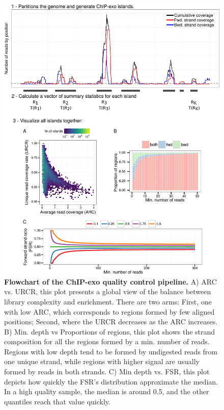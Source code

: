 \documentclass{bmcart}\usepackage[]{graphicx}\usepackage[]{color}
\begin{document}

\newpage

\begin{figure}[h!]
  \centering
  \includegraphics[width = \textwidth]{../figs/for_paper/coverage_diagram3.pdf}
  \caption{\textbf{Flowchart of the ChIP-exo quality control
      pipeline.} A) ARC vs. URCR, this plot presents a global view of
    the balance between library complexity and enrichment. There are
    two arms: First, one with low ARC, which corresponds to regions
    formed by few aligned positions; Second, where the URCR decreases
    as the ARC increases. B) Min. depth vs Proportions of regions,
    this plot shows the strand composition for all the regions formed
    by a min. number of reads. Regions with low depth tend to be
    formed by undigested reads from one unique strand, while regions
    with higher signal are usually formed by reads in both strands. C)
    Min depth vs. FSR, this plot depicts how quickly the FSR's
    distribution approximate the median. In a high quality sample, the
    median is around 0.5, and the other quantiles reach that value
    quickly.}
  \label{fig:qcdiagram}
\end{figure}
\end{document}
